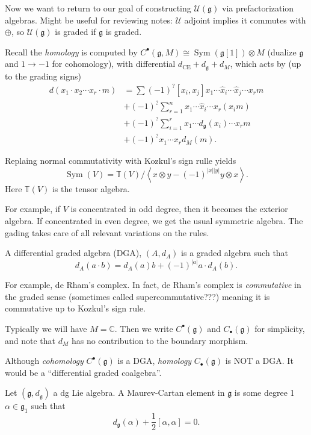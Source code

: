 
Now we want to return to our goal of constructing $\mathcal{U} (\mathfrak{g} )$ via prefactorization algebras. Might be useful for reviewing notes: $\mathcal{U} $ adjoint implies it commutes with $\oplus $, so $\mathcal{U} (\mathfrak{g} )$ is graded if $\mathfrak{g} $ is graded.

Recall the \emph{homology} is computed by $C^{\bullet} (\mathfrak{g} ,M)\cong \operatorname{Sym} (\mathfrak{g} [1])\otimes M$ (dualize $\mathfrak{g} $ and $1\to -1$ for cohomology), with differential $d_{\mathrm{CE} } +d_\mathfrak{g} +d_M$, which acts by (up to the grading signs)
\begin{align*}
	d(x_1\cdot x_2 \cdots x_r\cdot m)&=\sum (-1)^? [x_i,x_j]x_1 \cdots \hat{x} _i \cdots \hat{x} _j \cdots x_r m\\
					 &+(-1)^?\sum_{r=1}^{n} x_1 \cdots \hat{x} _i \cdots x_r(x_im)\\
					 &+(-1)^?\sum_{i=1}^{r} x_1 \cdots d_\mathfrak{g}(x_i)\cdots x_r m\\
					 &+(-1)^?x_1 \cdots x_r d_M(m)
.\end{align*}
\begin{remark}
	Replaing normal commutativity with Kozkul's sign rulle yields
	\[
		\operatorname{Sym} (V)=\mathbb{T} (V) / \left\langle x\otimes y - (-1)^{\left| x \right| \left| y \right| } y\otimes x \right\rangle 
	.\]
	Here $\mathbb{T} (V)$ is the tensor algebra.
\end{remark}
For example, if $V$ is concentrated in odd degree, then it becomes the exterior algebra. If concentrated in even degree, we get the usual symmetric algebra. The gading takes care of all relevant variations on the rules.

\begin{definition}\label{as}
	A differential graded algebra (DGA), $(A,d_A)$ is a graded algebra such that
	\[
		d_A(a\cdot b)=d_A(a)b + (-1)^{\left| a \right| } a\cdot d_A(b)
	.\]
\end{definition}
For example, de Rham's complex. In fact, de Rham's complex is \emph{commutative} in the graded sense (sometimes called supercommutative???) meaning it is commutative up to Kozkul's sign rule.

Typically we will have $M=\mathbb{C} $. Then we write $C^{\bullet} (\mathfrak{g} )$ and $C_{\bullet} (\mathfrak{g} )$ for simplicity, and note that $d_M$ has no contribution to the boundary morphism.

\begin{warning}
	Although \emph{cohomology} $C^{\bullet} (\mathfrak{g} )$ is a DGA, \emph{homology} $C_{\bullet} (\mathfrak{g} )$ is NOT a DGA. It would be a ``differential graded coalgebra''.
\end{warning}
\begin{definition}\label{asds}
	Let $(\mathfrak{g} ,d_\mathfrak{g} )$ a dg Lie algebra. A Maurev-Cartan element in $\mathfrak{g} $ is some degree 1 $\alpha \in \mathfrak{g} _1$ such that
	\[
		d_\mathfrak{g} (\alpha )+\frac{1}{2} [\alpha ,\alpha ]=0
	.\]
\end{definition}

